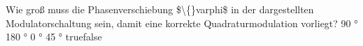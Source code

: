     {Wie groß muss die Phasenverschiebung \$\textbackslash\{\}varphi\$ in der dargestellten Modulatorschaltung sein, damit eine korrekte Quadraturmodulation vorliegt?}
    {90 °}
    {180 °}
    {0 °}
    {45 °}
    {true}{false}